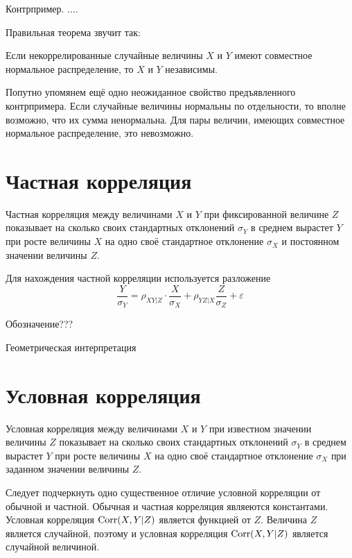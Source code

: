 \documentclass[10pt]{article}
\begin{document}
Контрпример. ....

Правильная теорема звучит так:

\begin{theorem}
Если некоррелированные случайные величины $X$ и $Y$ имеют совместное нормальное распределение, то $X$ и $Y$ независимы.
\end{theorem}

Попутно упомянем ещё одно неожиданное свойство предъявленного контрпримера. Если случайные величины нормальны по отдельности, то вполне возможно, что их сумма ненормальна. Для пары величин, имеющих совместное нормальное распределение, это невозможно.


\section{Частная корреляция}

\begin{definition}
Частная корреляция между величинами $X$ и $Y$ при фиксированной величине $Z$ показывает на сколько своих стандартных отклонений $\sigma_Y$ в среднем вырастет $Y$ при росте величины $X$ на одно своё стандартное отклонение $\sigma_X$ и постоянном значении величины $Z$.
\end{definition}

Для нахождения частной корреляции используется разложение
\[
\frac{Y}{\sigma_Y}=\rho_{XY|Z} \cdot \frac{X}{\sigma_X} + \rho_{YZ|X} \frac{Z}{\sigma_Z} + \varepsilon
\]


Обозначение???

Геометрическая интерпретация

\section{Условная корреляция}

\begin{definition}
Условная корреляция между величинами $X$ и $Y$ при известном значении величины $Z$ показывает на сколько своих стандартных отклонений $\sigma_Y$ в среднем вырастет $Y$ при росте величины $X$ на одно своё стандартное отклонение $\sigma_X$ при заданном значении величины $Z$.
\end{definition}


Следует подчеркнуть одно существенное отличие условной корреляции от обычной и частной. Обычная и частная корреляция являеются константами. Условная корреляция $\operatorname{Corr}(X,Y|Z)$ является функцией от $Z$. Величина $Z$ является случайной, поэтому и условная корреляция $\operatorname{Corr}(X,Y|Z)$ является случайной величиной. 
\end{document}
